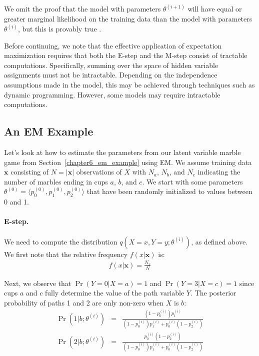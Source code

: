 \noindent We omit the proof that the model with parameters
$\theta^{(i+1)}$ will have equal or greater marginal likelihood on the
training data than the model with parameters $\theta^{(i)}$, but this
is provably true \cite{Jelinek_1997}.

Before continuing, we note that the effective application of
expectation maximization requires that both the E-step and the M-step
consist of tractable computations.  Specifically, summing over the
space of hidden variable assignments must not be intractable.
Depending on the independence assumptions made in the model, this may
be achieved through techniques such as dynamic programming.  However,
some models may require intractable computations.

\subsection{An EM Example}

Let's look at how to estimate the parameters from our latent variable
marble game from Section~\ref{chapter6_em_example} using EM.  We
assume training data $\textbf{x}$ consisting of $N=|\textbf{x}|$
observations of $X$ with $N_a$, $N_b$, and $N_c$ indicating the number
of marbles ending in cups $a$, $b$, and $c$.  We start with some
parameters $\theta^{(0)}=\langle p_0^{(0)}, p_1^{(0)}, p_2^{(0)}
\rangle$ that have been randomly initialized to values between 0 and
1.

\paragraph{\textbf{E-step.}}
We need to compute the distribution $q(X=x,Y=y;\theta^{(i)})$, as
defined above.  We first note that the relative frequency
$f(x|\textbf{x})$ is:
\begin{eqnarray}
f(x|\textbf{x}) = \frac{N_x}{N}
\end{eqnarray}

\noindent Next, we observe that $\Pr(Y=0|X=a)=1$ and $\Pr(Y=3|X=c)=1$
since cups $a$ and $c$ fully determine the value of the path variable
$Y$.  The posterior probability of paths 1 and 2 are only non-zero
when $X$ is $b$:
\begin{eqnarray}
\Pr(1|b;\theta^{(i)}) &=& \frac{(1-p_0^{(i)}) p_1^{(i)}}{(1-p_0^{(i)}) p_1^{(i)} + p_0^{(i)} (1-p_2^{(i)})} \\
\Pr(2|b;\theta^{(i)}) &=& \frac{p_0^{(i)} (1-p_2^{(i)})}{(1-p_0^{(i)}) p_1^{(i)} + p_0^{(i)} (1-p_2^{(i)})}
\end{eqnarray}

